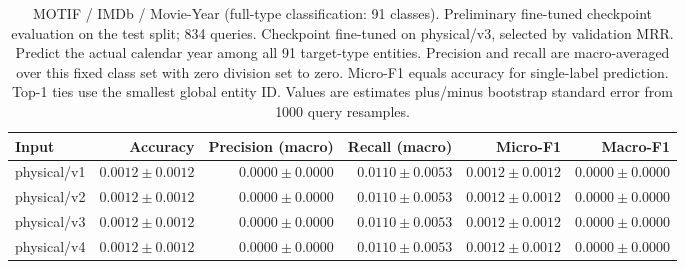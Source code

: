\begin{table}[t]
\centering
\small
\begin{tabular}{lrrrrr}
\toprule
Input & Accuracy & Precision (macro) & Recall (macro) & Micro-F1 & Macro-F1 \\
\midrule
physical/v1 & $0.0012 \pm 0.0012$ & $0.0000 \pm 0.0000$ & $0.0110 \pm 0.0053$ & $0.0012 \pm 0.0012$ & $0.0000 \pm 0.0000$ \\
physical/v2 & $0.0012 \pm 0.0012$ & $0.0000 \pm 0.0000$ & $0.0110 \pm 0.0053$ & $0.0012 \pm 0.0012$ & $0.0000 \pm 0.0000$ \\
physical/v3 & $0.0012 \pm 0.0012$ & $0.0000 \pm 0.0000$ & $0.0110 \pm 0.0053$ & $0.0012 \pm 0.0012$ & $0.0000 \pm 0.0000$ \\
physical/v4 & $0.0012 \pm 0.0012$ & $0.0000 \pm 0.0000$ & $0.0110 \pm 0.0053$ & $0.0012 \pm 0.0012$ & $0.0000 \pm 0.0000$ \\
\bottomrule
\end{tabular}
\caption{MOTIF / IMDb / Movie-Year (full-type classification: 91 classes). Preliminary fine-tuned checkpoint evaluation on the test split; 834 queries. Checkpoint fine-tuned on physical/v3, selected by validation MRR. Predict the actual calendar year among all 91 target-type entities. Precision and recall are macro-averaged over this fixed class set with zero division set to zero. Micro-F1 equals accuracy for single-label prediction. Top-1 ties use the smallest global entity ID. Values are estimates plus/minus bootstrap standard error from 1000 query resamples.}
\label{tab:motif-movie_year-classification}
\end{table}
